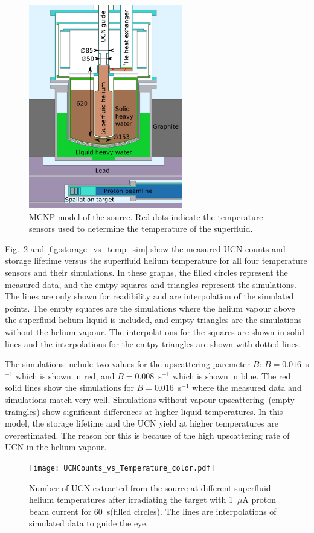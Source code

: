 \begin{figure}[h!]
  \centering
  \includegraphics[width=0.6\textwidth]{MCNPmodel.pdf}
  \caption{MCNP model of the source. Red dots indicate the temperature
    sensors used to determine the temperature of the superfluid.}
  \label{fig:mcnpmodel}
\end{figure}


Fig.~\ref{fig:Counts_vs_temp_sim} and \ref{fig:storage_vs_temp_sim}
show the measured UCN counts and storage lifetime versus the
superfluid helium temperature for all four temperature sensors and
their simulations. In these graphs, the filled circles represent the
measured data, and the emtpy squares and triangles represent the
simulations. The lines are only shown for readibility and are
interpolation of the simulated points. The empty squares are the simulations
where the helium vapour above the superfluid helium liquid is included,
and empty triangles are the simulations without the helium vapour. The
interpolations for the squares are shown in solid lines and the
interpolations for the emtpy triangles are shown with dotted lines.

The simulations include two values for the upscattering paremeter $B$:
$B= 0.016$~s$^{-1}$ which is shown in red, and $B= 0.008$~s$^{-1}$
which is shown in blue. The red solid lines show the simulations for
$B= 0.016$~s$^{-1}$ where the measured data and simulations match very
well. Simulations without vapour upscattering~(empty traingles) show
significant differences at higher liquid temperatures. In this model,
the storage lifetime and the UCN yield at higher temperatures are
overestimated. The reason for this is because of the high upscattering
rate of UCN in the helium vapour.
\begin{figure}[h!]
  \centering
  \texttt{[image: UCNCounts\_vs\_Temperature\_color.pdf]}
  \caption{Number of UCN extracted from the source at different
    superfluid helium temperatures after irradiating the target with
    1~$\mu$A proton beam current for 60~s(filled circles). The lines
    are interpolations of simulated data to guide the eye.}
  \label{fig:Counts_vs_temp_sim}
\end{figure}

